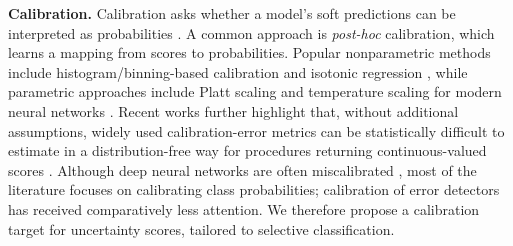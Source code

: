 \documentclass{article}
\theoremstyle{plain}
\theoremstyle{definition}
\theoremstyle{remark}
\begin{document}
\textbf{Calibration.}
Calibration asks whether a model’s soft predictions can be interpreted as probabilities \cite{brier_verification_1950}.
A common approach is \emph{post-hoc} calibration, which learns a mapping from scores to probabilities.
Popular nonparametric methods include histogram/binning-based calibration \cite{naeini_binary_2014, zadrozny_obtaining_nodate}
and isotonic regression \cite{isotonic, berta_classifier_2023}, while parametric approaches include Platt scaling
\cite{plat_scaling} and temperature scaling for modern neural networks \cite{guo2017calibrationmodernneuralnetworks}.
Recent works further highlight that, without additional assumptions, widely used calibration-error metrics can be
statistically difficult to estimate in a distribution-free way for procedures returning continuous-valued scores
\cite{gupta2022distributionfreebinaryclassificationprediction, arrieta-ibarra_metrics_2022, rossellini2025calibrationmetrictestableactionable}.
Although deep neural networks are often miscalibrated \cite{guo2017calibrationmodernneuralnetworks}, most of the literature
focuses on calibrating class probabilities; calibration of error detectors has received comparatively less attention. We therefore propose a calibration target for uncertainty scores, tailored to selective classification.

\end{document}
